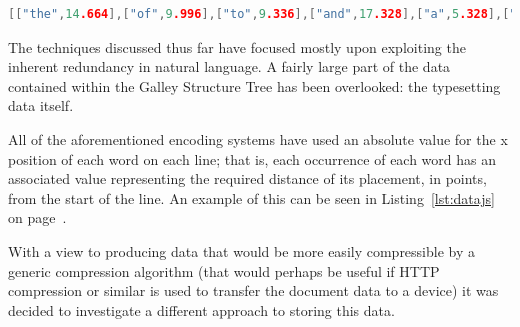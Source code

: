 \begin{lstlisting}[label=lst:deltasdict,captionpos=b,float,language=c,stringstyle=\color{blue},basicstyle=\ttfamily\footnotesize,caption={[Excerpt from a dictionary storing word widths]Excerpt from the dictionary from a JavaScript data file that uses position deltas, where the width of each word is stored alongside the word itself. This is the dictionary from a rendering of \cite{Pinkney2011}: compare its ordering to that shown in Table~\ref{tab:wordfreq} on page~\pageref{tab:wordfreq}.}]
 [["the",14.664],["of",9.996],["to",9.336],["and",17.328],["a",5.328],["is",8.004],["be",11.328],["in",9.336],["as",9.996],["document",47.328],["that",18],["it",6.672],["page",22.656],["for",13.992],["are",14.652],["by",12],["on",12],["will",18.672],["which",29.328],["with",21.336],["this",17.34],["The",18.66],["can",16.656],["an",11.328],["or",9.996],["-",3.996],["eBook",31.332],["used",21.996],["PDF",22.008],["In",9.996],["layout",30],["have",22.656],["from",23.328],["not",15.336],["at",8.664],["width",27.336],["This",21.336],["has",15.996],["then",20.664],["each",21.984],["was",18.66],["typesetting",52.668],["columns",40.668],["simply",32.676],["these",24.66],["text",18],["into",18.672],["hyphenation",59.328],["content",35.328],["quality",33.336],["column",36],["lines",22.668],["only",21.336],["line",18],["ACM",27.336],["our",15.996],["its",11.34],["structure",41.988],["Document",49.992],["penalty",35.328],["between",39.984],["galley",29.328],["order",25.32],["more",24.66],["COGs",30],["out",15.336],["end",17.328],["one",17.328],["use",15.996],["algorithm",46.668],["producing",48.66],["columns.",43.668],["galleys",33.996],["figure",28.656],["simple",32.004],["would",30],
\end{lstlisting}

The techniques discussed thus far have focused mostly upon exploiting the inherent redundancy in natural language. A fairly large part of the data contained within the Galley Structure Tree has been overlooked: the typesetting data itself.

All of the aforementioned encoding systems have used an absolute value for the x position of each word on each line; that is, each occurrence of each word has an associated value representing the required distance of its placement, in \glspl{point}, from the start of the line. An example of this can be seen in Listing~\ref{lst:datajs} on page~\pageref{lst:datajs}.

With a view to producing data that would be more easily compressible by a generic compression algorithm (that would perhaps be useful if \textsc{HTTP} compression or similar is used to transfer the document data to a device) it was decided to investigate a different approach to storing this data.

